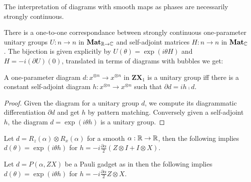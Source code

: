 \begin{remark}
The interpretation of diagrams with smooth maps as phases are necessarily strongly continuous.
\end{remark}

\begin{theorem}[Stone]
There is a one-to-one correspondance between strongly continuous one-parameter
unitary groups $U : n \to n$ in $\mathbf{Mat}_{\mathbb{R} \to \mathbb{C}}$ and self-adjoint
matrices $H : n \to n$ in $\mathbf{Mat}_{\mathbb{C}}$. The bijection is given
explicitly by $U(\theta) = \exp(i \theta H)$ and $H = - i (\partial U)(0)$,
translated in terms of diagrams with bubbles we get:
\end{theorem}

\begin{corollary}
A one-parameter diagram $d : x^{\otimes n} \to x^{\otimes n}$ in
$\mathbf{ZX}_1$ is a unitary group iff there is a constant
self-adjoint diagram
$h : x^{\otimes n} \to x^{\otimes n}$ such that $\partial d = i h \fcmp d$.
\end{corollary}

\begin{proof}
Given the diagram for a unitary group $d$, we compute its diagrammatic
differentiation $\partial d$ and get $h$ by pattern matching.
Conversely given a self-adjoint $h$, the diagram $d = \exp(i \theta h)$
is a unitary group.
\end{proof}

\begin{example}
Let $d = R_z(\alpha) \otimes R_x(\alpha)$ for a smooth $\alpha : \mathbb{R} \to \mathbb{R}$, then the following implies $d(\theta) = \exp(i \theta h)$ for $h = - i \frac{\partial \alpha}{2}(Z \otimes I + I \otimes X)$.
\end{example}

\begin{example}
Let $d = P(\alpha, ZX)$ be a Pauli gadget as in \cite[Definition~4.1]{CowtanEtAl20a} then
the following implies
$d(\theta) = \exp(i \theta h)$ for $h = -i \frac{\partial \alpha}{2} Z \otimes X$.
\end{example}
